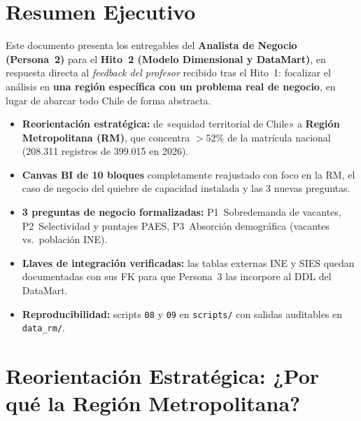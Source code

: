 \documentclass[11pt,a4paper]{article}
\begin{document}
\tableofcontents
\newpage

\section{Resumen Ejecutivo}
\label{sec:resumen}

Este documento presenta los entregables del \textbf{Analista de Negocio (Persona~2)}
para el \textbf{Hito~2 (Modelo Dimensional y DataMart)}, en respuesta directa al
\emph{feedback del profesor} recibido tras el Hito~1: focalizar el análisis en
\textbf{una región específica con un problema real de negocio}, en lugar de
abarcar todo Chile de forma abstracta.

\begin{tcolorbox}[colback=white, colframe=accentteal,
    title=\textbf{Cuadro Resumen del Hito 2 (Persona 2)}]
\begin{itemize}[leftmargin=*]
    \item \textbf{Reorientación estratégica:} de «equidad territorial de Chile»
          a \textbf{Región Metropolitana (RM)}, que concentra $>52\%$ de la
          matrícula nacional (208.311 registros de 399.015 en 2026).
    \item \textbf{Canvas BI de 10 bloques} completamente reajustado con foco en
          la RM, el caso de negocio del quiebre de capacidad instalada y las
          3 nuevas preguntas.
    \item \textbf{3 preguntas de negocio formalizadas:}
          P1~Sobredemanda de vacantes,
          P2~Selectividad y puntajes PAES,
          P3~Absorción demográfica (vacantes vs.\ población INE).
    \item \textbf{Llaves de integración verificadas:} las tablas externas
          INE y SIES quedan documentadas con sus FK para que Persona~3 las
          incorpore al DDL del DataMart.
    \item \textbf{Reproducibilidad:} scripts \texttt{08} y \texttt{09} en
          \texttt{scripts/} con salidas auditables en \texttt{data\_rm/}.
\end{itemize}
\end{tcolorbox}

\section{Reorientación Estratégica: ¿Por qué la Región Metropolitana?}
\label{sec:reorientacion}
\end{document}
